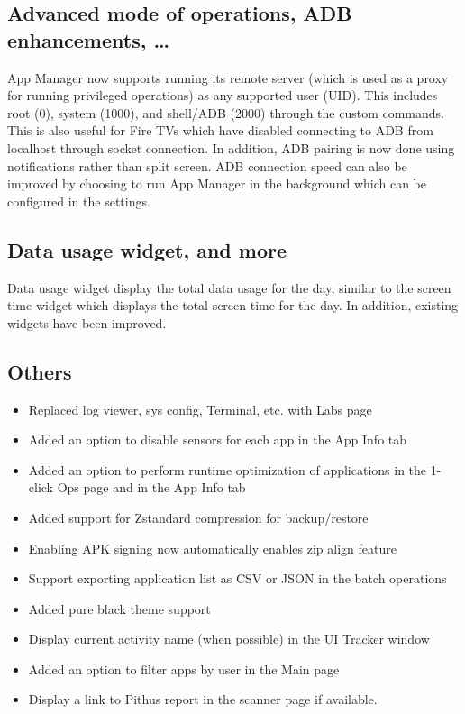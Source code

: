 \subsection{Advanced mode of operations, ADB enhancements, \dots}
App Manager now supports running its remote server (which is used as a proxy for running privileged
operations) as any supported user (UID). This includes root (0), system (1000), and shell/ADB (2000)
through the custom commands. This is also useful for Fire TVs which have disabled connecting to ADB
from localhost through socket connection. In addition, ADB pairing is now done using notifications
rather than split screen. ADB connection speed can also be improved by choosing to run App Manager
in the background which can be configured in the settings.

\subsection{Data usage widget, and more}
Data usage widget display the total data usage for the day, similar to the screen time widget which
displays the total screen time for the day. In addition, existing widgets have been improved.

\subsection{Others}
\begin{itemize}
    \item Replaced log viewer, sys config, Terminal, etc. with Labs page
    \item Added an option to disable sensors for each app in the App Info tab
    \item Added an option to perform runtime optimization of applications in the 1-click Ops page
    and in the App Info tab
    \item Added support for Zstandard compression for backup/restore
    \item Enabling APK signing now automatically enables zip align feature
    \item Support exporting application list as CSV or JSON in the batch operations
    \item Added pure black theme support
    \item Display current activity name (when possible) in the UI Tracker window
    \item Added an option to filter apps by user in the Main page
    \item Display a link to Pithus report in the scanner page if available.
\end{itemize}


